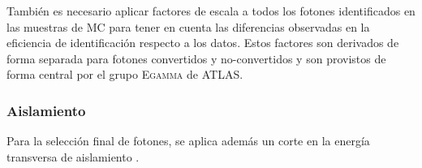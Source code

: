 
También es necesario aplicar factores de escala a todos los fotones
identificados en las muestras de MC para tener en cuenta las diferencias
observadas en la eficiencia de identificación respecto a los datos. Estos
factores son derivados de forma separada para fotones convertidos y
no-convertidos y son provistos de forma central por el grupo
\textsc{Egamma} de ATLAS.


\subsubsection{Aislamiento}

Para la selección final de fotones, se aplica además un corte en la energía
transversa de aislamiento {\etiso}.



